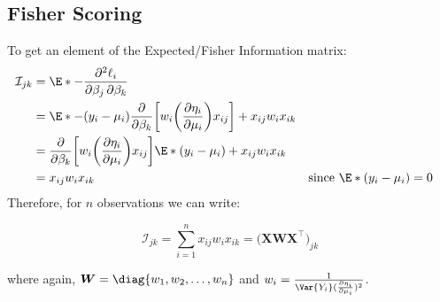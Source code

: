 \documentclass[oneside]{book}\usepackage[]{graphicx}\usepackage[svgnames]{xcolor}
\providecommand{\Matrix}[1]{\bm{#1}}
\begin{document}
\subsection*{Fisher Scoring}
To get an element of the Expected/Fisher Information matrix:
\begin{align*}
    \mathcal{I}_{jk}
     & =\E*{-\pdv{\ell_i}{\beta_j,\beta_k}}                                                                                                               \\
     & =\E*{-(y_i-\mu_i)\pdv*{\biggl[w_i\biggl(\pdv{\eta_i}{\mu_i}\biggr)x_{ij}\biggr]}{\beta_k}+x_{ij}w_i x_{ik}}                                        \\
     & =\pdv*{\biggl[w_i\biggl(\pdv{\eta_i}{\mu_i}\biggr)x_{ij}\biggr]}{\beta_k}\E*{(y_i-\mu_i)}+x_{ij}w_i x_{ik}                                         \\
     & =x_{ij}w_i x_{ik}                                                                                           &  & \text{since $\E*{(y_i-\mu_i)}=0$}
\end{align*}
Therefore, for $ n $ observations we can write:
\begin{Regular}{}
    \[ \mathcal{I}_{jk}=\sum_{i=1}^{n}x_{ij}w_i x_{ik}=\bigl(\Matrix{X}\Matrix{W}\Matrix{X}^\top\bigr)_{jk} \]
\end{Regular}
where again, $ \Matrix{W}=\diag{w_1,w_2,\ldots,w_n} $ and $ w_i=\frac{1}{\Var{Y_i}(\pdv{\eta_i}{\mu_i})^2} $.
\end{document}
